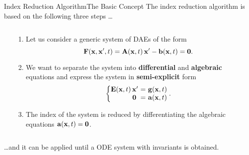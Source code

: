 \begin{frame}{Index Reduction Algorithm}{The Basic Concept}
  The index reduction algorithm is based on the following three steps \dots
  \begin{columns}
    \begin{column}[c]{0.2\textwidth}
      \flushright
      \vspace{-2.5em}%
    \end{column}
    \begin{column}[c]{0.85\textwidth}
      \begin{enumerate}
        \item Let us consider a generic system of \acp{DAE} of the form
        \begin{equation*}
          \mathbf{F}(\mathbf{x}, \mathbf{x}^\prime, t) = \mathbf{A}(\mathbf{x}, t) \, \mathbf{x}^\prime - \mathbf{b}(\mathbf{x}, t) = \mathbf{0} \text{.}
        \end{equation*}
        \item We want to separate the system into \textbf{differential} and \textbf{algebraic} equations and express the system in \textbf{semi-explicit} form
        \begin{equation*}
          \left\{\!\!\!\begin{array}{r@{~}c@{~}l}
            \mE \, \mxp &=& \mg \\
            \m{0}\phantom{\prime} &=& \ma
          \end{array}\!\!\!\right. \text{.}
        \end{equation*}
        \item The index of the system is reduced by differentiating the algebraic equations $\mathbf{a}(\mathbf{x}, t) = \mathbf{0}$.
      \end{enumerate}
    \end{column}
  \end{columns}
  \vspace{0.75em}
  \dots and it can be applied until a \acs{ODE} system with invariants is obtained.
\end{frame}

